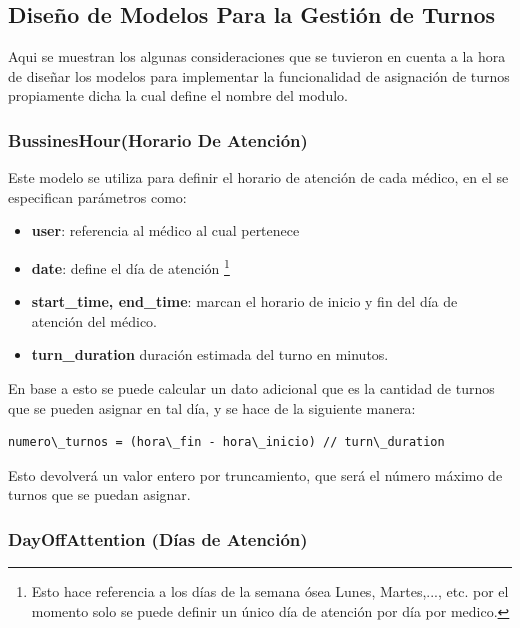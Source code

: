 
\subsection{Diseño de Modelos Para la Gestión de Turnos}

Aqui se muestran los algunas consideraciones que se tuvieron en cuenta a la hora de diseñar los modelos para implementar la funcionalidad de asignación de turnos propiamente dicha la cual define el nombre del modulo. 


\subsubsection{BussinesHour(Horario De Atención)}

Este modelo se utiliza para definir el horario de atención de cada médico, en el se especifican parámetros como:

\begin{itemize}
    \item \textbf{user}: referencia al médico al cual pertenece 
    \item \textbf{date}: define el día de atención \footnote{Esto hace  referencia a los días de la semana ósea Lunes, Martes,..., etc. por el momento solo se puede definir un único día de atención por día por medico.}
    \item \textbf{start\_time, end\_time}: marcan el horario de inicio y fin del  día de atención del médico.
    \item \textbf{turn\_duration} duración estimada del turno en minutos.
\end{itemize}

En base a esto se puede calcular un dato adicional que es la cantidad de turnos que se pueden asignar en tal día, y se hace de la siguiente manera:

\begin{lstlisting}
numero\_turnos = (hora\_fin - hora\_inicio) // turn\_duration
\end{lstlisting}

Esto devolverá un valor entero por truncamiento, que será el número máximo de turnos que se puedan asignar.


\subsubsection{DayOffAttention (Días de Atención)}

